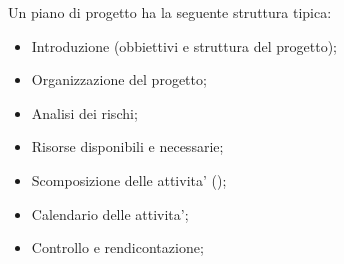 Un piano di progetto ha la seguente struttura tipica:

\begin{itemize}
  \item Introduzione (obbiettivi e struttura del progetto);
  \item Organizzazione del progetto;
  \item Analisi dei rischi;
  \item Risorse disponibili e necessarie;
  \item Scomposizione delle attivita' ();
  \item Calendario delle attivita';
  \item Controllo e rendicontazione;
\end{itemize}
